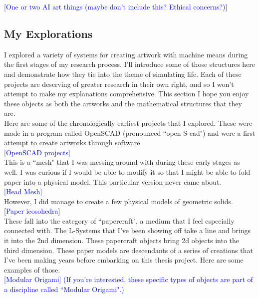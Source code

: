 \documentclass[12pt,twoside]{reedthesis}
\begin{document}
	\textcolor{blue}{[One or two AI art things (maybe don't include this? Ethical concerns?)]}
	
\subsection{My Explorations} %
	
	I explored a variety of systems for creating artwork with machine means during the first stages of my research process. I'll introduce some of those structures here and demonstrate how they tie into the theme of simulating life. Each of these projects are deserving of greater research in their own right, and so I won't attempt to make my explanations comprehensive. This section I hope you enjoy these objects as both the artworks and the mathematical structures that they are.\\

	Here are some of the chronologically earliest projects that I explored. These were made in a program called OpenSCAD (pronounced ``open S cad") and were a first attempt to create artworks through software.\\
	
	\textcolor{blue}{[OpenSCAD projects]}\\
	
	This is a ``mesh" that I was messing around with during these early stages as well. I was curious if I would be able to modify it so that I might be able to fold paper into a physical model. This particular version never came about.\\
	
	\textcolor{blue}{[Head Mesh]}\\
	
	However, I did manage to create a few physical models of geometric solids.\\
	
	\textcolor{blue}{[Paper icosohedra]}\\
	
	These fall into the category of ``papercraft", a medium that I feel especially connected with. The L-Systems that I've been showing off take a line and brings it into the 2nd dimension. These papercraft objects bring 2d objects into the third dimension. These paper models are descendants of a series of creations that I've been making years before embarking on this thesis project. Here are some examples of those.\\
	
	\textcolor{blue}{[Modular Origami] (If you're interested, these specific types of objects are part of a discipline called ``Modular Origami".)}\\
	
\end{document}
